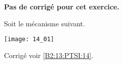 \normalfalse \difficiletrue \tdifficilefalse
\correctionfalse


\setcounter{question}{0}
\ifcorrection
\else
\textbf{Pas de corrigé pour cet exercice.}
\fi

\ifprof
\else
Soit le mécanisme suivant. 

\begin{center}
\texttt{[image: 14\_01]}
\end{center}
\fi


\ifprof
\else
\fi



\ifprof
\else
\footnotesize
\ifcolle
\else
\fi
\normalsize

\begin{flushright}
\footnotesize{Corrigé  voir \ref{B2:13:PTSI:14}.}
\end{flushright}%
\fi